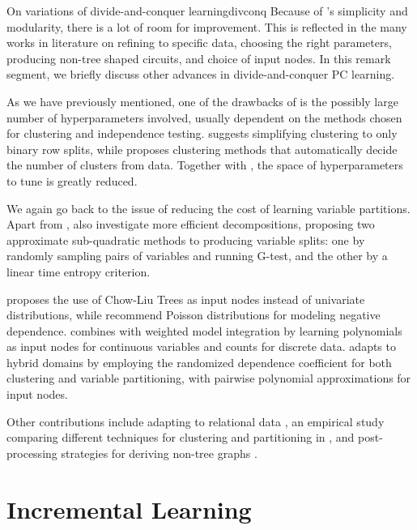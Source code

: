 \begin{remark}[breakable]{On variations of divide-and-conquer learning}{divconq}
  Because of 's simplicity and modularity, there is a lot of room for
  improvement. This is reflected in the many works in literature on refining  to
  specific data, choosing the right parameters, producing non-tree shaped circuits, and choice of
  input nodes. In this remark segment, we briefly discuss other advances in divide-and-conquer PC
  learning.

  As we have previously mentioned, one of the drawbacks of  is the possibly
  large number of hyperparameters involved, usually dependent on the methods chosen for clustering
  and independence testing. \citet{vergari15} suggests simplifying clustering to only binary row
  splits, while \citet{liu19} proposes clustering methods that automatically decide the number of
  clusters from data. Together with , the space of hyperparameters to tune is
  greatly reduced.

  We again go back to the issue of reducing the cost of learning variable partitions. Apart
  from , \citet{dimauro17a} also investigate more efficient decompositions,
  proposing two approximate sub-quadratic methods to producing variable splits: one by randomly
  sampling pairs of variables and running G-test, and the other by a linear time entropy criterion.

  \citet{vergari15} proposes the use of Chow-Liu Trees as input nodes instead of univariate
  distributions, while \citet{molina17} recommend Poisson distributions for modeling negative
  dependence. \citet{bueff18} combines  with weighted model integration by
  learning polynomials as input nodes for continuous variables and counts for discrete data.
  \citet{molina18} adapts  to hybrid domains by employing the randomized
  dependence coefficient for both clustering and variable partitioning, with pairwise polynomial
  approximations for input nodes.

  Other contributions include adapting  to relational data \citep{nath15}, an
  empirical study comparing different techniques for clustering and partitioning in
   \citep{butz18a}, and  post-processing strategies for
  deriving non-tree graphs \citep{tahrima16}.
\end{remark}

\section{Incremental Learning}
\label{sec:incremental}

